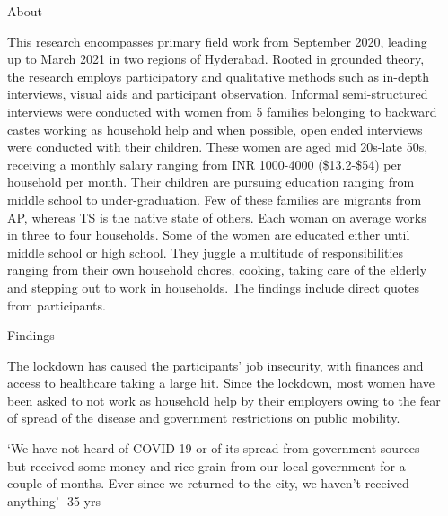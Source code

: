 \documentclass[final]{beamer}
\newlength{\sepwidth}
\newlength{\colwidth}
\newcommand{\separatorcolumn}{\begin{column}{\sepwidth}\end{column}}
\begin{document}
\begin{frame}[t]
\begin{columns}[t]
\begin{column}{\colwidth}
  \begin{block}{About}

This research encompasses primary field work from September 2020,
leading up to March 2021 in two regions of Hyderabad. Rooted in
grounded theory, the research employs participatory and qualitative
methods such as in-depth interviews, visual aids and participant
observation. Informal semi-structured interviews were conducted with
women from 5 families belonging to backward castes working as
household help and when possible, open ended interviews were
conducted with their children. These women are aged mid 20s-late 50s,
receiving a monthly salary ranging from INR 1000-4000 (\$13.2-\$54) per
household per month. Their children are pursuing education ranging
from middle school to under-graduation. Few of these families are
migrants from AP, whereas TS is the native state of others. Each woman
on average works in three to four households. Some of the women are
educated either until middle school or high school. They juggle a
multitude of responsibilities ranging from their own household chores,
cooking, taking care of the elderly and stepping out to work in
households. The findings include direct quotes from participants.

  \end{block}

  \begin{block}{Findings}

  The lockdown has caused the participants’ job insecurity, with finances
and access to healthcare taking a large hit. Since the lockdown, most
women have been asked to not work as household help by their
employers owing to the fear of spread of the disease and government
restrictions on public mobility.

\end{block}

 \begin{alertblock}{}

‘We have not heard of COVID-19 or
of its spread from government
sources but received some money
and rice grain from our local
government for a couple of
months. Ever since we returned to
the city, we haven’t received
anything’- 35 yrs

  \end{alertblock}



\end{column}

\separatorcolumn


\end{columns}
\end{frame}
\end{document}

